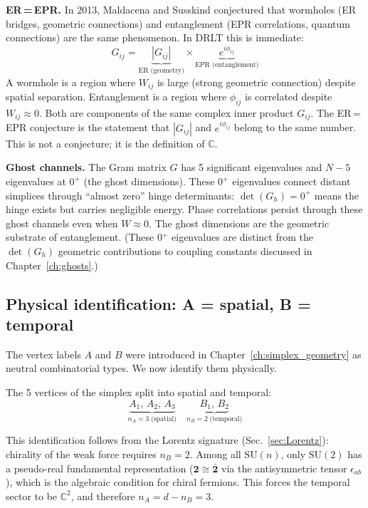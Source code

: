 \documentclass[12pt]{article}
\theoremstyle{remark}
\theoremstyle{definition}
\newcommand{\CC}{\mathbb{C}}
\begin{document}
\textbf{ER\,=\,EPR.} In 2013, Maldacena and Susskind conjectured that wormholes (ER bridges, geometric connections) and entanglement (EPR correlations, quantum connections) are the same phenomenon. In DRLT this is immediate:
\begin{equation}
G_{ij} = \underbrace{|G_{ij}|}_{\text{ER (geometry)}} \times \underbrace{e^{i\phi_{ij}}}_{\text{EPR (entanglement)}}
\end{equation}
A wormhole is a region where $W_{ij}$ is large (strong geometric connection) despite spatial separation. Entanglement is a region where $\phi_{ij}$ is correlated despite $W_{ij} \approx 0$. Both are components of the same complex inner product $G_{ij}$. The ER\,=\,EPR conjecture is the statement that $|G_{ij}|$ and $e^{i\phi_{ij}}$ belong to the same number. This is not a conjecture; it is the definition of $\CC$.

\textbf{Ghost channels.} The Gram matrix $G$ has 5 significant eigenvalues and $N - 5$ eigenvalues at $0^+$ (the ghost dimensions). These $0^+$ eigenvalues connect distant simplices through ``almost zero'' hinge determinants: $\det(G_h) = 0^+$ means the hinge exists but carries negligible energy. Phase correlations persist through these ghost channels even when $W \approx 0$. The ghost dimensions are the geometric substrate of entanglement. (These 0$^+$ eigenvalues are distinct from the $\det(G_h)$ geometric contributions to coupling constants discussed in Chapter~\ref{ch:ghosts}.)

\subsection{Physical identification: A = spatial, B = temporal}
\label{sec:causal_split}

The vertex labels $A$ and $B$ were introduced in Chapter~\ref{ch:simplex_geometry} as neutral combinatorial types. We now identify them physically.

The 5 vertices of the simplex split into spatial and temporal:
\begin{equation}
\underbrace{A_1,\,A_2,\,A_3}_{n_A = 3\;\text{(spatial)}} \quad \underbrace{B_1,\,B_2}_{n_B = 2\;\text{(temporal)}}
\end{equation}

This identification follows from the Lorentz signature (Sec.~\ref{sec:Lorentz}): chirality of the weak force requires $n_B = 2$. Among all $\text{SU}(n)$, only $\text{SU}(2)$ has a pseudo-real fundamental representation ($\mathbf{2} \cong \bar{\mathbf{2}}$ via the antisymmetric tensor $\epsilon_{ab}$), which is the algebraic condition for chiral fermions. This forces the temporal sector to be $\CC^2$, and therefore $n_A = d - n_B = 3$.
\end{document}
